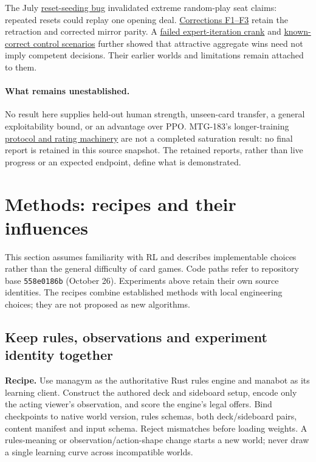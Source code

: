 \documentclass[11pt]{article}
\newcommand{\code}[1]{\texttt{\small #1}}
\newcommand{\source}[2]{\href{https://github.com/loopflowstudio/manabot/blob/558e0186b585228dd2130cf14d9cb40de217e66f/#1}{#2}}
\newcommand{\report}[2]{\source{experiments/#1}{#2}}
\begin{document}
The July \report{exp-06-newworld-training.md}{reset-seeding bug} invalidated extreme random-play seat claims: repeated resets could replay one opening deal. \source{paper/understanding.md}{Corrections F1--F3} retain the retraction and corrected mirror parity. A \report{exp-07-expert-iteration.md}{failed expert-iteration crank} and \report{exp-09-control-competency.md}{known-correct control scenarios} further showed that attractive aggregate wins need not imply competent decisions. Their earlier worlds and limitations remain attached to them.

\paragraph{What remains unestablished.}
No result here supplies held-out human strength, unseen-card transfer, a general exploitability bound, or an advantage over PPO. MTG-183's longer-training \report{protocols/elemental-183.md}{protocol and rating machinery} are not a completed saturation result: no final report is retained in this source snapshot. The retained reports, rather than live progress or an expected endpoint, define what is demonstrated.

\clearpage
\section{Methods: recipes and their influences}
\label{sec:methods}

This section assumes familiarity with RL and describes implementable choices rather than the general difficulty of card games. Code paths refer to repository base \code{558e0186b} (October 26). Experiments above retain their own source identities. The recipes combine established methods with local engineering choices; they are not proposed as new algorithms.

\subsection{Keep rules, observations and experiment identity together}

\textbf{Recipe.} Use managym as the authoritative Rust rules engine and manabot as its learning client. Construct the authored deck and sideboard setup, encode only the acting viewer's observation, and score the engine's legal offers. Bind checkpoints to native world version, rules schemas, both deck/sideboard pairs, content manifest and input schema. Reject mismatches before loading weights. A rules-meaning or observation/action-shape change starts a new world; never draw a single learning curve across incompatible worlds.
\end{document}
